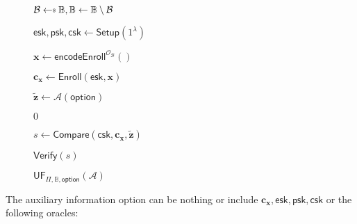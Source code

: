 \begin{figure}[h]
\centering
	\begin{minipage}[t]{0.6\linewidth}
	\centering
	\begin{algorithm}[H]
	\caption{$\textsf{UF}_{\Pi, \mathbb{B}, \textsf{option}}(\mathcal{A})$}
	\label{alg:uf_game}
	\begin{algorithmic}[1]
		\State $\mathcal{B} \getsdollar \mathbb{B}, \mathbb{B} \gets \mathbb{B} \setminus \mathcal{B}$

		\State $\textsf{esk}, \textsf{psk}, \textsf{csk} \gets \textsf{Setup}(1^\lambda)$
		
		\State $\mathbf{x} \gets \textsf{encodeEnroll}^{\mathcal{O}_{\mathcal{B}}}()$

		\State $\mathbf{c_x} \gets \textsf{Enroll}(\textsf{esk}, \mathbf{x})$
		
		\State ${\mathbf{\tilde{z}}} \gets \mathcal{A} ( \textsf{option} )$
 
			
			\State \Return $0$
		
		\EndIf

		\State $s \gets \textsf{Compare}( \textsf{csk}, \mathbf{c_x}, \mathbf{\tilde{z}} )$

		\State \Return $\textsf{Verify}(s)$
	\end{algorithmic}
	\end{algorithm}
	\end{minipage}
	
\label{fig:uf_game}
\end{figure}

The auxiliary information \textsf{option} can be nothing or include $\mathbf{c_x}, \textsf{esk}, \textsf{psk}, \textsf{csk}$ or the following oracles:

